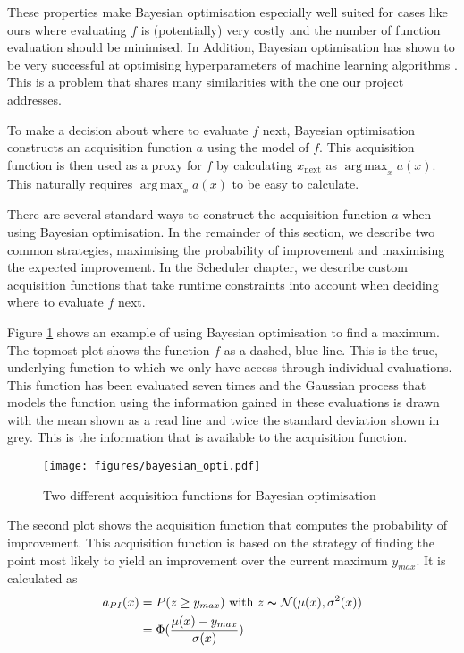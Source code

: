 \documentclass[a4paper,12pt,twoside,openright]{report}
\DeclareMathOperator*{\argmax}{arg\,max}
\begin{document}
These properties make Bayesian optimisation especially well suited for cases like ours where evaluating $f$ is (potentially) very costly and the number of function evaluation should be minimised. In Addition, Bayesian optimisation has shown to be very successful at optimising hyperparameters of machine learning algorithms \cite{PracticalBayesianOptimization}. This is a problem that shares many similarities with the one our project addresses.

To make a decision about where to evaluate $f$ next, Bayesian optimisation constructs an acquisition function $a$ using the model of $f$. This acquisition function is then used as a proxy for $f$ by calculating $x_{\text{next}}$ as $\argmax_x a(x)$. This naturally requires $\argmax_x a(x)$ to be easy to calculate.

There are several standard ways to construct the acquisition function $a$ when using Bayesian optimisation. In the remainder of this section, we describe two common strategies, maximising the probability of improvement and maximising the expected improvement. In the Scheduler chapter, we describe custom acquisition functions that take runtime constraints into account when deciding where to evaluate $f$ next.

Figure \ref{bayesianopti} shows an example of using Bayesian optimisation to find a maximum. The topmost plot shows the function $f$ as a dashed, blue line. This is the true, underlying function to which we only have access through individual evaluations. This function has been evaluated seven times and the Gaussian process that models the function using the information gained in these evaluations is drawn with the mean shown as a read line and twice the standard deviation shown in grey. This is the information that is available to the acquisition function.

\begin{figure}
\centering
  \texttt{[image: figures/bayesian\_opti.pdf]}
  \caption{Two different acquisition functions for Bayesian optimisation}
  \label{bayesianopti}
\end{figure}

The second plot shows the acquisition function that computes the probability of improvement. This acquisition function is based on the strategy of finding the point most likely to yield an improvement over the current maximum $y_{max}$. It is calculated as
\begin{align}
a_{PI}(x) &= P(z \geq y_{max}) \text{\ with\ } z \thicksim \mathcal{N}(\mu(x),\sigma^2(x))\label{eq:pi_equation}\\
&=\Phi(\frac{\mu(x) - y_{max}}{\sigma(x)})
\end{align}
\end{document}
